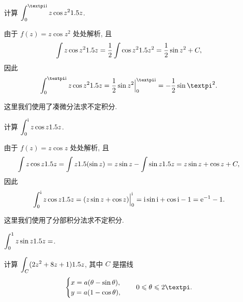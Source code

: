 \begin{example}
  计算 $\dint_0^{\cpi\ii }z\cos z^2\d z$.
\end{example}

\begin{solution}
  由于 $f(z)=z\cos z^2$ 处处解析, 且
  \[
     \int z\cos z^21.5 z
    =\frac{1}{2}\int \cos z^21.5 z^2=\frac{1}{2}\sin z^2+C,
  \]
  因此
  \[
     \int_0^{\cpi\ii }z\cos z^2\d z
    =\half\sin z^2\Big|_0^{\cpi\ii}
    =-\half\sin \cpi^2.
  \]
\end{solution}

这里我们使用了\alert{凑微分法}求不定积分.

\begin{example}
  计算 $\displaystyle\int_0^{\mathrm{i}} z\cos z1.5 z$.
\end{example}

\begin{solution}
  由于 $f(z)=z\cos z$ 处处解析, 且
  \[
     \int z\cos z1.5 z
    =\int z1.5(\sin z)
    =z\sin z-\int \sin z1.5 z
    =z\sin z+\cos z+C,
  \]
  因此
  \[
     \int_0^{\mathrm{i}} z\cos z1.5 z
    =(z\sin z+\cos z)\Big|_0^{\mathrm{i}} 
    =\mathrm{i} \sin\mathrm{i} +\cos\mathrm{i}-1
    =\mathrm{e}^{-1}-1.
  \]
\end{solution}

这里我们使用了\alert{分部积分法}求不定积分.



\begin{exercise}
  $\displaystyle\int_0^1 z\sin z1.5 z=$\fillblank{}.
\end{exercise}

\begin{example}
  计算 $\displaystyle\int_C(2z^2+8z+1)1.5 z$, 其中 $C$ 是摆线
  \[
    \begin{cases}
      x=a(\theta-\sin\theta),\\
      y=a(1-\cos\theta),
    \end{cases}
    \quad 0\le \theta\le 2\cpi.
  \]
\end{example}


